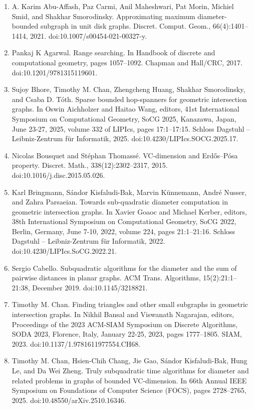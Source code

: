 \documentclass[10pt,a4paper]{article}
\begin{document}
\begin{enumerate}
\item[]  [1]  A. Karim Abu-Affash, Paz Carmi, Anil Maheshwari, Pat Morin, Michiel Smid, and Shakhar Smorodinsky.  Approximating maximum diameter-bounded subgraph in unit disk graphs.  Discret. Comput. Geom., 66(4):1401–1414, 2021.  doi:10.1007/s00454-021-00327-y.  
\item[]  [2]  Pankaj K Agarwal.  Range searching.  In Handbook of discrete and computational geometry, pages 1057–1092. Chapman and Hall/CRC, 2017.  doi:10.1201/9781315119601.  
\item[]  [3]  Sujoy Bhore, Timothy M. Chan, Zhengcheng Huang, Shakhar Smorodinsky, and Csaba D. Tóth.  Sparse bounded hop-spanners for geometric intersection graphs.  In Oswin Aichholzer and Haitao Wang, editors, 41st International Symposium on Computational Geometry, SoCG 2025, Kanazawa, Japan, June 23-27, 2025, volume 332 of LIPIcs, pages 17:1–17:15. Schloss Dagstuhl – Leibniz-Zentrum für Informatik, 2025.  doi:10.4230/LIPIcs.SOCG.2025.17.  
\item[]  [4]  Nicolas Bousquet and Stéphan Thomassé.  VC-dimension and Erdős–Pósa property.  Discret. Math., 338(12):2302–2317, 2015.  doi:10.1016/j.disc.2015.05.026.  
\item[]  [5]  Karl Bringmann, Sándor Kisfaludi-Bak, Marvin Künnemann, André Nusser, and Zahra Parsaeian.  Towards sub-quadratic diameter computation in geometric intersection graphs.  In Xavier Goaoc and Michael Kerber, editors, 38th International Symposium on Computational Geometry, SoCG 2022, Berlin, Germany, June 7-10, 2022, volume 224, pages 21:1–21:16. Schloss Dagstuhl – Leibniz-Zentrum für Informatik, 2022.  doi:10.4230/LIPIcs.SoCG.2022.21.  
\item[]  [6]  Sergio Cabello.  Subquadratic algorithms for the diameter and the sum of pairwise distances in planar graphs.  ACM Trans. Algorithms, 15(2):21:1–21:38, December 2019.  doi:10.1145/3218821.  
\item[]  [7]  Timothy M. Chan.  Finding triangles and other small subgraphs in geometric intersection graphs.  In Nikhil Bansal and Viswanath Nagarajan, editors, Proceedings of the 2023 ACM-SIAM Symposium on Discrete Algorithms, SODA 2023, Florence, Italy, January 22-25, 2023, pages 1777–1805. SIAM, 2023.  doi:10.1137/1.9781611977554.CH68.  
\item[]  [8]  Timothy M. Chan, Hsien-Chih Chang, Jie Gao, Sándor Kisfaludi-Bak, Hung Le, and Da Wei Zheng.  Truly subquadratic time algorithms for diameter and related problems in graphs of bounded VC-dimension.  In 66th Annual IEEE Symposium on Foundations of Computer Science (FOCS), pages 2728–2765, 2025.  doi:10.48550/arXiv.2510.16346.  

\end{enumerate}
\end{document}
